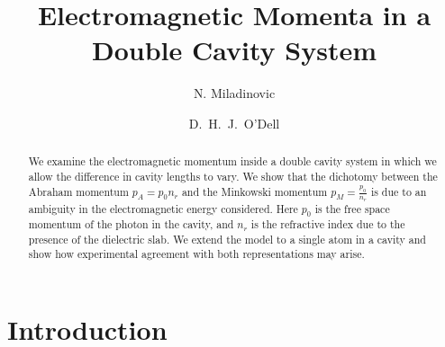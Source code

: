 \documentclass[twocolumn,english,pra,aps,superscriptaddress,floatfix]{revtex4-1}
\begin{document}
\author{N. Miladinovic}
\author{D.\ H.\ J.\ O'Dell}

\title{Electromagnetic Momenta in a Double Cavity System}

\begin{abstract}
\label{sec:abstract}
We examine the electromagnetic momentum inside a double cavity system in which we allow the difference in cavity lengths to vary.  We show that the dichotomy between the Abraham momentum $p_A= p_{0} n_{r}$ and the Minkowski momentum $p_M=\frac{p_{0}}{n_{r}}$ is due to an ambiguity in the electromagnetic energy considered.  Here $p_0$ is the free space momentum of the photon in the cavity, and $n_{r}$ is the refractive index due to the presence of the dielectric slab.  We extend the model to a single atom in a cavity and show how experimental agreement with both representations may arise. 
\end{abstract}


\maketitle

\section{Introduction}
\label{sec:intro}
\end{document}
